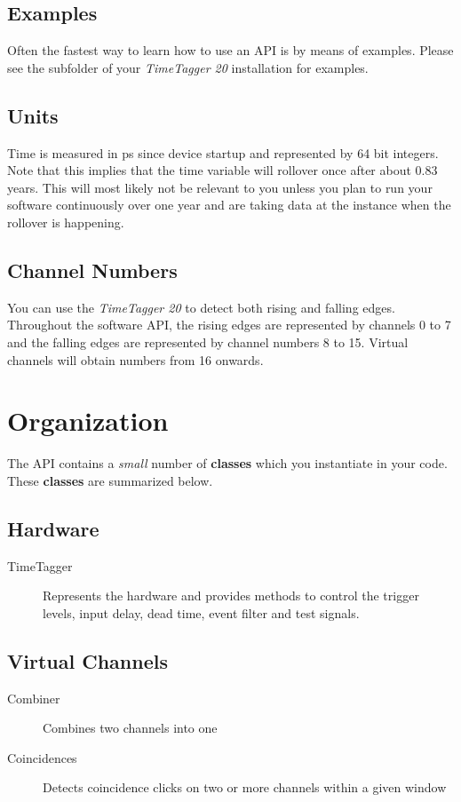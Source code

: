 \documentclass[letterpaper,10pt,english]{sphinxmanual}
\begin{document}
\subsection{Examples}
\label{sections/api:examples}
Often the fastest way to learn how to use an API is by means of examples. Please see the 
subfolder of your \emph{TimeTagger 20} installation for examples.


\subsection{Units}
\label{sections/api:units}
Time is measured in ps since device startup and represented by 64 bit integers. Note that this
implies that the time variable will rollover once after about 0.83 years. This
will most likely not be relevant to you unless you plan to run your software
continuously over one year and are taking data at the instance when the rollover is happening.


\subsection{Channel Numbers}
\label{sections/api:channel-numbers}
You can use the \emph{TimeTagger 20} to detect both rising and falling edges. Throughout
the software API, the rising edges are represented by channels 0 to 7 and
the falling edges are represented by channel numbers 8 to 15. Virtual channels will obtain numbers
from 16 onwards.


\section{Organization}
\label{sections/api:organization}
The API contains a \emph{small} number of \textbf{classes} which you instantiate in your code.
These \textbf{classes} are summarized below.


\subsection{Hardware}
\label{sections/api:hardware}\begin{description}
\item[{TimeTagger}] \leavevmode
Represents the hardware and provides methods to control the trigger levels, input delay, dead time, event filter and test signals.

\end{description}


\subsection{Virtual Channels}
\label{sections/api:virtual-channels}\begin{description}
\item[{Combiner}] \leavevmode
Combines two channels into one

\item[{Coincidences}] \leavevmode
Detects coincidence clicks on two or more channels within a given window

\end{description}
\end{document}
